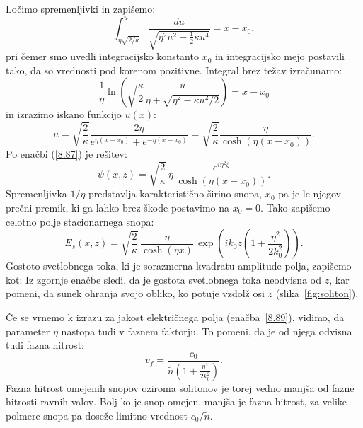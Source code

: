 Ločimo spremenljivki in zapišemo:
\begin{equation}
\int_{\eta\sqrt{2/\kappa}}^{u}\frac{du}{\sqrt{\eta^{2}u^2-\frac{1}{2}\kappa u^{4}}}=x-x_{0},
\label{8.85}
\end{equation}
pri čemer smo uvedli integracijsko konstanto $x_{0}$ in integracijsko mejo postavili 
tako, da so vrednosti pod korenom pozitivne.
Integral brez težav izračunamo:
\begin{equation}
\frac{1}{\eta}\ln\left(\sqrt{\frac{\kappa}{2}}\frac{u}{\eta+
\sqrt{\eta^{2}-\kappa u^{2}/2}}\right)=x-x_{0}
\end{equation}
in izrazimo iskano funkcijo $u(x)$:
\begin{equation}
u=\sqrt{\frac{2}{\kappa}}\frac{2 \eta }{e^{\eta(x-x_{0})}+e^{-\eta(x-x_{0})}}=
\sqrt{\frac{2}{\kappa}}\frac{\eta}{\cosh \left(\eta(x-x_{0})\right)}.
\label{8.86}
\end{equation}
Po enačbi (\ref{8.87}) je rešitev:
\begin{equation}
\psi(x,z)=\sqrt{\frac{2}{\kappa}}\,\eta\,\frac{e^{i\eta^{2}\zeta}}{\cosh \left(\eta(x-x_{0})\right)}.
\label{8.88}
\end{equation}
Spremenljivka $1/\eta$ predstavlja karakteristično širino snopa, $x_{0}$ pa
je le njegov prečni premik, ki ga lahko brez škode postavimo na $x_0=0$. Tako
zapišemo celotno polje stacionarnega snopa:
\begin{equation}
E_{s}(x,z)=\sqrt{\frac{2}{\kappa}}\,\frac{\eta}{\cosh(\eta x)}\,\exp\left(ik_{0}z\left(1+
\frac{\eta^{2}}{2k_{0}^{2}}\right)\right)\!\!.
\label{8.89}
\end{equation}
Gostoto svetlobnega toka, ki je sorazmerna 
kvadratu amplitude polja, zapišemo kot:
Iz zgornje enačbe sledi, da je gostota svetlobnega toka neodvisna od $z$, kar pomeni, da sunek  ohranja svojo obliko, ko potuje vzdolž osi $z$ (slika~\ref{fig:soliton}).

Če se vrnemo k izrazu za jakost električnega polja (enačba~\ref{8.89}), vidimo, da
parameter $\eta$ nastopa tudi v faznem faktorju. To pomeni, da je od njega odvisna 
tudi fazna hitrost:
\begin{equation}
v_{f}= \frac{c_0}{\tilde{n}\left(1+\frac{\eta^{2}}{2k_{0}^{2}}\right)}.
\end{equation}
Fazna hitrost omejenih snopov oziroma solitonov je torej
vedno manjša od fazne hitrosti ravnih valov. 
Bolj ko je snop omejen, manjša je fazna hitrost, za velike polmere snopa pa doseže 
limitno vrednost $c_0/\tilde{n}$.


